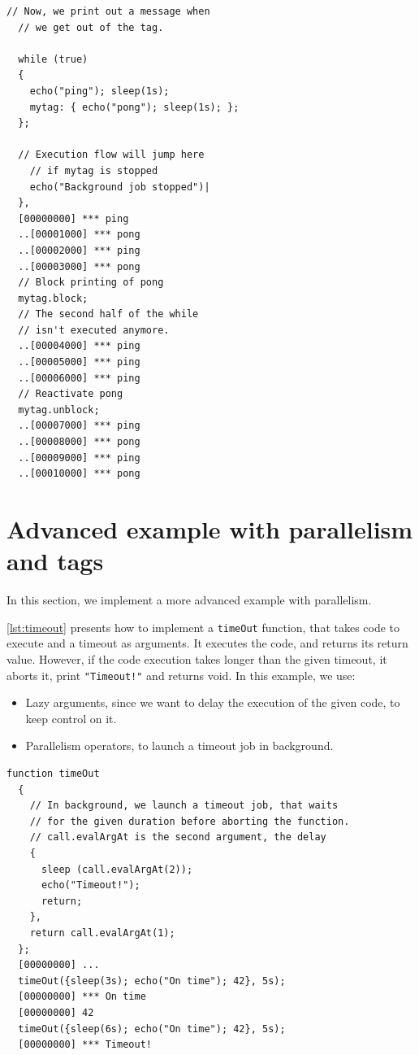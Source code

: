 \documentclass[openright,twoside,12pt]{report}
\newcommand{\lst}[1]{\autoref{lst:#1}}
\begin{document}
\begin{lstlisting}[caption=Blocking chunks of code, label=lst:block]
  // Now, we print out a message when
  // we get out of the tag.

  while (true)
  {
    echo("ping"); sleep(1s);
    mytag: { echo("pong"); sleep(1s); };
  };

  // Execution flow will jump here
    // if mytag is stopped
    echo("Background job stopped")|
  },
  [00000000] *** ping
  ..[00001000] *** pong
  ..[00002000] *** ping
  ..[00003000] *** pong
  // Block printing of pong
  mytag.block;
  // The second half of the while
  // isn't executed anymore.
  ..[00004000] *** ping
  ..[00005000] *** ping
  ..[00006000] *** ping
  // Reactivate pong
  mytag.unblock;
  ..[00007000] *** ping
  ..[00008000] *** pong
  ..[00009000] *** ping
  ..[00010000] *** pong
\end{lstlisting}

\section{Advanced example with parallelism and tags}

In this section, we implement a more advanced example with
parallelism.

\lst{timeout} presents how to implement a \texttt{timeOut} function,
that takes code to execute and a timeout as arguments. It executes the
code, and returns its return value. However, if the code execution
takes longer than the given timeout, it aborts it, print
\lstinline|"Timeout!"| and returns void. In this example, we use:

\begin{itemize}
\item Lazy arguments, since we want to delay the execution of the
  given code, to keep control on it.
\item Parallelism operators, to launch a timeout job in background.
\end{itemize}

\begin{lstlisting}[caption=Implementing a timeout method, label=lst:timeout]
  function timeOut
  {
    // In background, we launch a timeout job, that waits
    // for the given duration before aborting the function.
    // call.evalArgAt is the second argument, the delay
    {
      sleep (call.evalArgAt(2));
      echo("Timeout!");
      return;
    },
    return call.evalArgAt(1);
  };
  [00000000] ...
  timeOut({sleep(3s); echo("On time"); 42}, 5s);
  [00000000] *** On time
  [00000000] 42
  timeOut({sleep(6s); echo("On time"); 42}, 5s);
  [00000000] *** Timeout!
\end{lstlisting}
\end{document}
